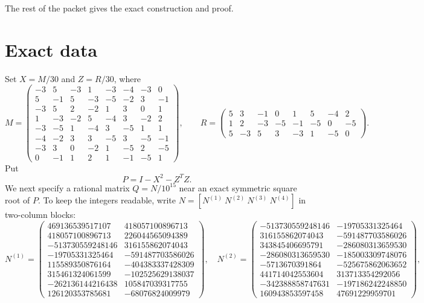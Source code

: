 \documentclass[11pt]{article}
\begin{document}
The rest of the packet gives the exact construction and proof.

\section{Exact data}

Set $X=M/30$ and $Z=R/30$, where
{\small
\[
M=\begin{pmatrix}
-3&5&-3&1&-3&-4&-3&0\\
5&-1&5&-3&-5&-2&3&-1\\
-3&5&2&-2&1&3&0&1\\
1&-3&-2&5&-4&3&-2&2\\
-3&-5&1&-4&3&-5&1&1\\
-4&-2&3&3&-5&3&-5&-1\\
-3&3&0&-2&1&-5&2&-5\\
0&-1&1&2&1&-1&-5&1
\end{pmatrix},\qquad
R=\begin{pmatrix}
5&3&-1&0&1&5&-4&2\\
1&2&-3&-5&-1&-5&0&-5\\
5&-3&5&3&-3&1&-5&0
\end{pmatrix}.
\]
}
Put
\[
 P=I-X^2-Z^TZ.
\]
We next specify a rational matrix $Q=N/10^{15}$ near an exact symmetric
square root of $P$.  To keep the integers readable, write
$N=[N^{(1)}\ N^{(2)}\ N^{(3)}\ N^{(4)}]$ in two-column blocks:
{\scriptsize
\[
N^{(1)}=\begin{pmatrix}
469136539517107&418057100896713\\
418057100896713&226044565094389\\
-513730559248146&316155862074043\\
-19705331325464&-591487703586026\\
115589350876164&-404383337428309\\
315461324061599&-102525629138037\\
-262136144216438&105847039317755\\
126120353785681&-68076824009979
\end{pmatrix},\quad
N^{(2)}=\begin{pmatrix}
-513730559248146&-19705331325464\\
316155862074043&-591487703586026\\
343845406695791&-286080313659530\\
-286080313659530&-185003309748076\\
-5713670391864&-525675862063652\\
441714042553604&313713354292056\\
-342388858747631&-197186242248850\\
160943853597458&47691229959701
\end{pmatrix},
\]
}
\end{document}
